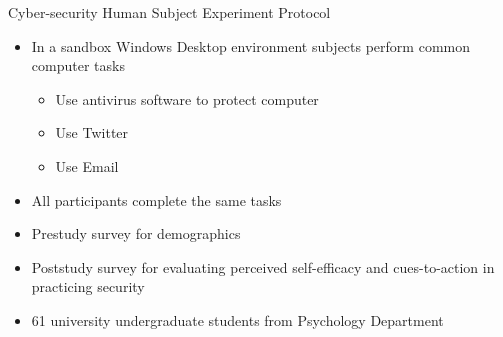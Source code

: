 \begin{frame}{Cyber-security Human Subject Experiment Protocol}
\begin{itemize}
\item In a sandbox Windows Desktop environment subjects perform common computer tasks
\begin{itemize}
\item Use antivirus software to protect computer
\item Use Twitter
\item Use Email
\end{itemize}
\item All participants complete the same tasks
\item Prestudy survey for demographics
\item Poststudy survey for evaluating perceived self-efficacy and cues-to-action in practicing security
\item 61 university undergraduate students from Psychology Department
\end{itemize}

\end{frame}